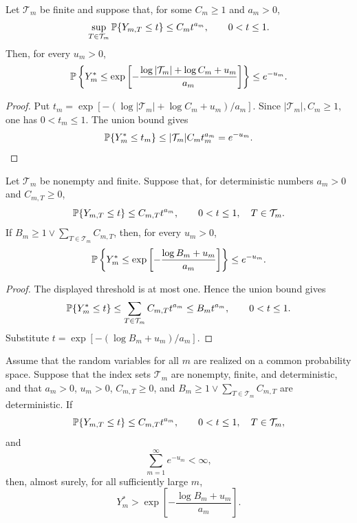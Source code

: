 \begin{corollary}\label{cor:finite-budget}
Let \(\mathcal T_m\) be finite and suppose that, for some \(C_m\ge1\) and
\(a_m>0\),
\[
  \sup_{T\in\mathcal T_m}\mathbb{P}\{Y_{m,T}\le t\}\le C_m t^{a_m},
  \qquad 0<t\le1.
\]
Then, for every \(u_m>0\),
\[
  \mathbb{P}\left\{
    Y_m^*\le
    \exp\left[-\frac{\log|\mathcal T_m|+\log C_m+u_m}{a_m}\right]
  \right\}
  \le e^{-u_m}.
\]
\end{corollary}

\begin{proof}
Put \(t_m=\exp[-(\log|\mathcal T_m|+\log C_m+u_m)/a_m]\).  Since
\(|\mathcal T_m|,C_m\ge1\), one has \(0<t_m\le1\).  The union bound gives
\[
  \mathbb{P}\{Y_m^*\le t_m\}
  \le |\mathcal T_m| C_m t_m^{a_m}
  = e^{-u_m}.
\]
\end{proof}

\begin{corollary}\label{cor:nonuniform-finite-budget}
Let \(\mathcal T_m\) be nonempty and finite.  Suppose that, for deterministic
numbers \(a_m>0\) and \(C_{m,T}\ge0\),
\[
  \mathbb{P}\{Y_{m,T}\le t\}\le C_{m,T}t^{a_m},
  \qquad 0<t\le1,\quad T\in\mathcal T_m.
\]
If \(B_m\ge1\vee\sum_{T\in\mathcal T_m}C_{m,T}\), then, for every \(u_m>0\),
\[
  \mathbb{P}\left\{
    Y_m^*\le \exp\left[-\frac{\log B_m+u_m}{a_m}\right]
  \right\}
  \le e^{-u_m}.
\]
\end{corollary}

\begin{proof}
The displayed threshold is at most one.  Hence the union bound gives
\[
  \mathbb{P}\{Y_m^*\le t\}
  \le \sum_{T\in\mathcal T_m}C_{m,T}t^{a_m}
  \le B_m t^{a_m},\qquad 0<t\le1.
\]
Substitute \(t=\exp[-(\log B_m+u_m)/a_m]\).
\end{proof}

\begin{corollary}\label{cor:as-nonuniform-finite-budget}
Assume that the random variables for all \(m\) are realized on a common
probability space.  Suppose that the index sets \(\mathcal T_m\) are nonempty,
finite, and deterministic, and that \(a_m>0\), \(u_m>0\),
\(C_{m,T}\ge0\), and \(B_m\ge1\vee\sum_{T\in\mathcal T_m}C_{m,T}\) are
deterministic.  If
\[
  \mathbb{P}\{Y_{m,T}\le t\}\le C_{m,T}t^{a_m},
  \qquad 0<t\le1,\quad T\in\mathcal T_m,
\]
and
\[
  \sum_{m=1}^\infty e^{-u_m}<\infty,
\]
then, almost surely, for all sufficiently large \(m\),
\[
  Y_m^*>
  \exp\left[-\frac{\log B_m+u_m}{a_m}\right].
\]
\end{corollary}

